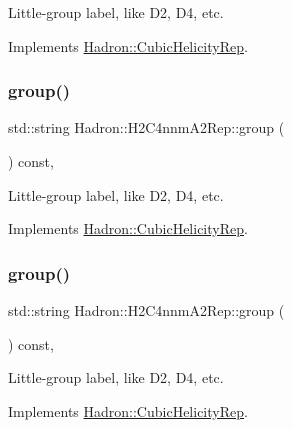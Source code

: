 Little-\/group label, like D2, D4, etc. 

Implements \mbox{\hyperlink{structHadron_1_1CubicHelicityRep_a101a7d76cd8ccdad0f272db44b766113}{Hadron\+::\+Cubic\+Helicity\+Rep}}.

\mbox{\label{structHadron_1_1H2C4nnmA2Rep_a5a67d986be4ac8ac591051bea3159855}} 
\subsubsection{\texorpdfstring{group()}{group()}\hspace{0.1cm}{\footnotesize\ttfamily [2/3]}}
{\footnotesize\ttfamily std\+::string Hadron\+::\+H2\+C4nnm\+A2\+Rep\+::group (\begin{DoxyParamCaption}{ }\end{DoxyParamCaption}) const\hspace{0.3cm}{\ttfamily [inline]}, {\ttfamily [virtual]}}

Little-\/group label, like D2, D4, etc. 

Implements \mbox{\hyperlink{structHadron_1_1CubicHelicityRep_a101a7d76cd8ccdad0f272db44b766113}{Hadron\+::\+Cubic\+Helicity\+Rep}}.

\mbox{\label{structHadron_1_1H2C4nnmA2Rep_a5a67d986be4ac8ac591051bea3159855}} 
\subsubsection{\texorpdfstring{group()}{group()}\hspace{0.1cm}{\footnotesize\ttfamily [3/3]}}
{\footnotesize\ttfamily std\+::string Hadron\+::\+H2\+C4nnm\+A2\+Rep\+::group (\begin{DoxyParamCaption}{ }\end{DoxyParamCaption}) const\hspace{0.3cm}{\ttfamily [inline]}, {\ttfamily [virtual]}}

Little-\/group label, like D2, D4, etc. 

Implements \mbox{\hyperlink{structHadron_1_1CubicHelicityRep_a101a7d76cd8ccdad0f272db44b766113}{Hadron\+::\+Cubic\+Helicity\+Rep}}.

